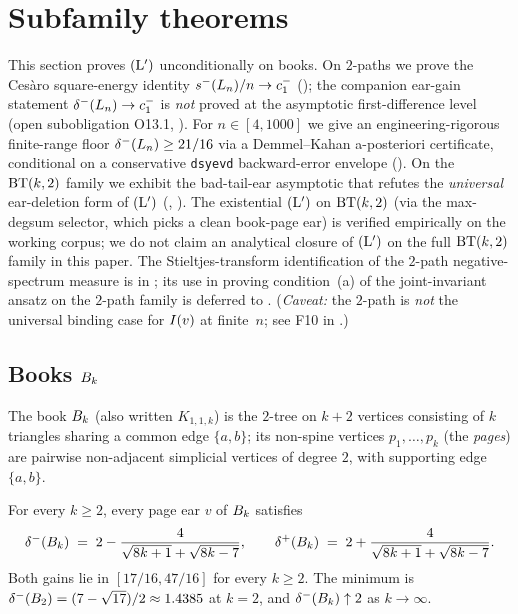 \section{Subfamily theorems}\label{sec:subfamily}

This section proves $(\mathrm{L}')$ unconditionally on books. On $2$-paths
we prove the Ces\`aro square-energy identity
$s^{-}(L_{n})/n \to c_{1}^{-}$ (); the
companion ear-gain statement $\delta^{-}(L_{n}) \to c_{1}^{-}$ is
\emph{not} proved at the asymptotic first-difference level (open
subobligation O13.1, ). For
$n \in [4, 1000]$ we give an engineering-rigorous finite-range
floor $\delta^{-}(L_{n}) \ge 21/16$ via a Demmel--Kahan a-posteriori
certificate, conditional on a conservative \texttt{dsyevd}
backward-error envelope (). On the $\mathrm{BT}(k,2)$
family we exhibit the bad-tail-ear asymptotic that refutes the
\emph{universal} ear-deletion form of $(\mathrm{L}')$
(, ). The
existential $(\mathrm{L}')$ on $\mathrm{BT}(k,2)$ (via the max-degsum selector,
which picks a clean book-page ear) is verified empirically on the
working corpus; we do not claim an analytical closure of $(\mathrm{L}')$ on
the full $\mathrm{BT}(k,2)$ family in this paper. The Stieltjes-transform
identification of the $2$-path negative-spectrum measure is in
; its use in proving condition~(a)
of the joint-invariant ansatz on the $2$-path family is deferred to
. (\emph{Caveat:} the $2$-path is
\emph{not} the universal binding case for $I(v)$ at finite~$n$; see F10
in .)

\subsection{Books \texorpdfstring{$B_{k}$}{B\_k}}\label{sec:subfamily:books}

The book $B_{k}$ (also written $K_{1, 1, k}$) is the $2$-tree on $k + 2$
vertices consisting of $k$ triangles sharing a common edge $\{a, b\}$;
its non-spine vertices $p_{1}, \ldots, p_{k}$ (the \emph{pages}) are
pairwise non-adjacent simplicial vertices of degree $2$, with supporting
edge $\{a, b\}$.

\begin{theorem}\label{thm:books}
For every $k \ge 2$, every page ear $v$ of $B_{k}$ satisfies
\[
\delta^{-}(B_{k}) \;=\; 2 - \frac{4}{\sqrt{8k+1} + \sqrt{8k-7}},
\qquad
\delta^{+}(B_{k}) \;=\; 2 + \frac{4}{\sqrt{8k+1} + \sqrt{8k-7}}.
\]
Both gains lie in $[17/16, 47/16]$ for every $k \ge 2$. The minimum is
$\delta^{-}(B_{2}) = (7 - \sqrt{17})/2 \approx 1.4385$ at $k = 2$, and
$\delta^{-}(B_{k}) \uparrow 2$ as $k \to \infty$.
\end{theorem}

